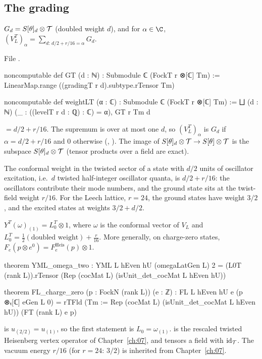 \subsection{The grading}
\begin{definition}\label{ch08:def:weightLT}
$G_d=S[\theta]_d\otimes\mathcal{T}$ (doubled weight $d$), and for $\alpha\in\C$,
$(V_L^T)_\alpha=\sum_{d:\,d/2+r/16=\alpha}G_d$.
\end{definition}
\noindent File .
\begin{leancode}
noncomputable def GT (d : ℕ) : Submodule ℂ (FockT r ⊗[ℂ] Tm) :=
  LinearMap.range ((gradingT r d).subtype.rTensor Tm)

noncomputable def weightLT (α : ℂ) : Submodule ℂ (FockT r ⊗[ℂ] Tm) :=
  ⨆ (d : ℕ) (_ : ((levelT r d : ℚ) : ℂ) = α), GT r Tm d
\end{leancode}
\begin{dictionary}
 $=d/2+r/16$.  The supremum is over at most one $d$, so
$(V_L^T)_\alpha$ is $G_d$ if $\alpha=d/2+r/16$ and $0$ otherwise (,
).  The image of $S[\theta]_d\otimes\mathcal{T}\to S[\theta]\otimes\mathcal{T}$ is
the subspace $S[\theta]_d\otimes\mathcal{T}$ (tensor products over a field are exact).
\end{dictionary}

\begin{physics}
The conformal weight in the twisted sector of a state with $d/2$ units of oscillator excitation, i.e.\ $d$ twisted half-integer oscillator quanta, is $d/2+r/16$: the oscillators contribute their mode numbers, and the ground state sits at the twist-field weight $r/16$. For the Leech lattice, $r=24$, the ground states have weight $3/2$, and the excited states at weights $3/2+d/2$.
\end{physics}

\begin{theorem}\label{ch08:thm:L0}
$Y^T(\omega)_{(1)}=L_0^T\otimes1$, where $\omega$ is the conformal vector of $V_L$ and
$L_0^T=\frac12(\text{doubled weight})+\frac r{16}$.  More generally, on charge-zero states,
$F_e(p\otimes e^0)=F^{\mathrm{Heis}}_e(p)\otimes1$.
\end{theorem}
\begin{leancode}
theorem YML_omega_two :
    YML L hEven hU (omegaLatGen L) 2
      = (L0T (rank L)).rTensor (Rep (cocMat L) (isUnit_det_cocMat L hEven hU))

theorem FL_charge_zero (p : FockN (rank L)) (e : ℤ) :
    FL L hEven hU e (p ⊗ₜ[ℂ] eGen L 0)
      = rTFld (Tm := Rep (cocMat L) (isUnit_det_cocMat L hEven hU)) (FT (rank L) e p)
\end{leancode}
\begin{dictionary}
 is $u_{(2/2)}=u_{(1)}$, so the first statement is $L_0=\omega_{(1)}$.   is
the rescaled twisted Heisenberg vertex operator of Chapter~\ref{ch:07}, and  tensors a
field with $\mathrm{id}_{\mathcal{T}}$.  The vacuum energy $r/16$ (for $r=24$: $3/2$) is inherited from
Chapter~\ref{ch:07}.
\end{dictionary}

